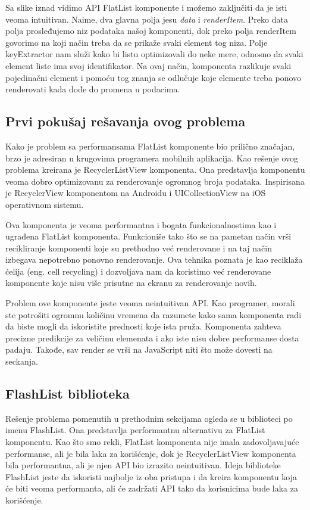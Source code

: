 \documentclass[12pt,oneside]{memoir}
\begin{document}
Sa slike iznad vidimo API FlatList komponente i možemo zaključiti da je isti veoma intuitivan. Naime, dva glavna polja jesu \textit{data} i \textit{renderItem}. Preko data polja prosleđujemo niz podataka našoj komponenti, dok preko polja renderItem govorimo na koji način treba da se prikaže svaki element tog niza. Polje keyExtractor nam služi kako bi listu optimizovali do neke mere, odnosno da svaki element liste ima svoj identifikator. Na ovaj način, komponenta razlikuje svaki pojedinačni element i pomoću tog znanja se odlučuje koje elemente treba ponovo renderovati kada dođe do promena u podacima.

\subsection{Prvi pokušaj rešavanja ovog problema}

Kako je problem sa performansama FlatList komponente bio prilično značajan, brzo je adresiran u krugovima programera mobilnih aplikacija. Kao rešenje ovog problema kreirana je RecyclerListView komponenta. Ona predstavlja komponentu veoma dobro optimizovanu za renderovanje ogromnog broja podataka. Inspirisana je RecyclerView komponentom na Androidu i UICollectionView na iOS operativnom sistemu. 


Ova komponenta je veoma performantna i bogata funkcionalnostima kao i ugrađena FlatList komponenta. Funkcioniše tako što se na pametan način vrši recikliranje komponenti koje su prethodno već renderovane i na taj način izbegava nepotrebno ponovno renderovanje. Ova tehnika poznata je kao reciklaža ćelija (eng. cell recycling) i dozvoljava nam da koristimo već renderovane komponente koje nisu više prisutne na ekranu za renderovanje novih.


Problem ove komponente jeste veoma neintuitivan API. Kao programer, morali ste potrošiti ogromnu količinu vremena da razumete kako sama komponenta radi da biste mogli da iskoristite prednosti koje ista pruža. Komponenta zahteva precizne predikcije za veličinu elemenata i ako iste nisu dobre performanse dosta padaju. Takođe, sav render se vrši na JavaScript niti što može dovesti na seckanja.

\subsection{FlashList biblioteka}

Rešenje problema pomenutih u prethodnim sekcijama ogleda se u biblioteci po imenu FlashList. Ona predstavlja performantnu alternativu za FlatList komponentu. Kao što smo rekli, FlatList komponenta nije imala zadovoljavajuće performanse, ali je bila laka za korišćenje, dok je RecyclerListView komponenta bila performantna, ali je njen API bio izrazito neintuitivan. Ideja biblioteke FlashList jeste da iskoristi najbolje iz oba pristupa i da kreira komponentu koja će biti veoma performanta, ali će zadržati API tako da korisnicima bude laka za korišćenje.
\end{document}
